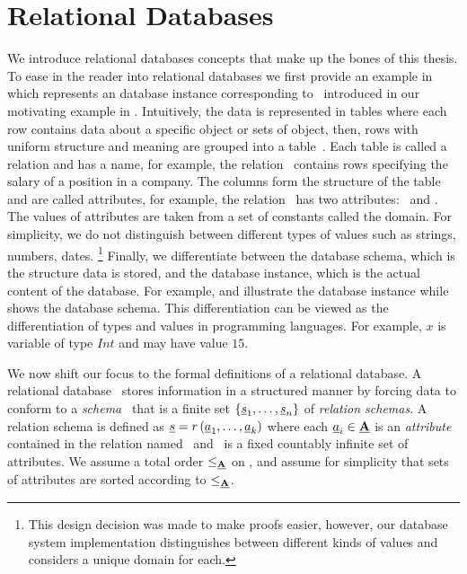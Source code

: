 \section{Relational Databases}
\label{sec:rdb}

We introduce relational databases concepts that make up the bones of this thesis. 
To ease in the reader into relational databases we first provide an example in 
which represents an database instance corresponding to \vTwo\ introduced in our motivating
example in . 
%
Intuitively, the data is represented in tables where each row contains  data about a specific
object or sets of object, then, rows with uniform structure and meaning are grouped into a
table~\cite{AliceBook}. Each table is called a relation and has a name, for example, 
the relation \job\ contains rows specifying the salary of a position in a company. 
The columns form the structure of the table and are called attributes,
for example, the relation \job\ has two attributes: \titleatt\ and \salary. 
The values of attributes are taken from a set of constants called the domain. 
For simplicity, 
we do not distinguish between different types of values such as strings, numbers,
dates.%
\footnote{This design decision was made to make proofs easier, however, our
database system implementation distinguishes between different kinds of values
and considers a unique domain for each.}
%
Finally, we differentiate between the database schema, which is the structure 
data is stored, and the database instance, which is the actual content of the 
database. 
%
For example,  and  illustrate the database 
instance while  shows the database schema. 
%
This differentiation can be viewed as the differentiation of types and
values in programming languages. For example, $x$ is variable of type $\mathit{Int}$
and may have value $15$. 





We now shift our focus to the formal definitions of a relational database. 
A relational database \pDB\ stores information in a structured manner by forcing
data to conform to a \emph{schema} \pSch\ that is a finite set 
$\setDef {{\pRelSch}_1, \ldots, {\pRelSch}_n}$ of \emph{relation schemas}.
A relation schema is defined as
$\pRelSch = \vRel \paran {\vi \pAtt k}$ where each $\pAtt_i \in \pAttSet$ is an
\emph{attribute} contained in the relation named \vRel\ and \pAttSet\ is a 
fixed countably infinite set of attributes. 
%
We assume a total order $\leq_{\pAttSet}$ on \pAttSet, and assume for
simplicity that sets of attributes are sorted according
to $\leq_{\pAttSet}$.
%

